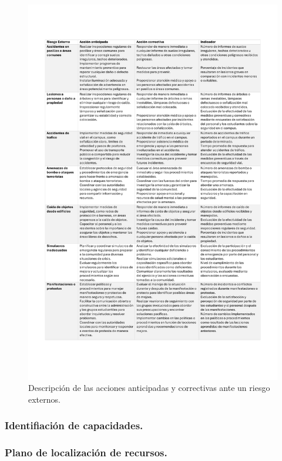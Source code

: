 \begin{figure}[H]
    \centering
    \includegraphics[scale=0.3]{15/img/tablaPlanDeAccionRiesgosExternos.pdf}
    \caption{Descripción de las acciones anticipadas y correctivas ante un riesgo externos.}
    \label{fig:tablaPlanDeAccionRiesgosExternos}
\end{figure}

\subsubsection{Identifiación de capacidades.}
% 
%
\subsubsection{Plano de localización de recursos.}
% 
%
